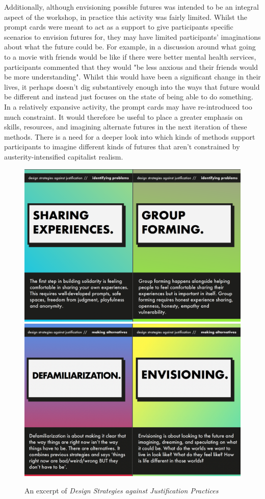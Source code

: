 Additionally, although envisioning possible futures was intended to be an integral aspect of the workshop, in practice this activity was fairly limited. Whilst the prompt cards were meant to act as a support to give participants specific scenarios to envision futures for, they may have limited participants' imaginations about what the future could be. For example, in a discussion around what going to a movie with friends would be like if there were better mental health services, participants commented that they would "be less anxious and their friends would be more understanding". Whilst this would have been a significant change in their lives, it perhaps doesn't dig substantively enough into the ways that future would be different and instead just focuses on the state of being able to do something. In a relatively expansive activity, the prompt cards may have re-introduced too much constraint. It would therefore be useful to place a greater emphasis on skills, resources, and imagining alternate futures in the next iteration of these methods. There is a need for a deeper look into which kinds of methods support participants to imagine different kinds of futures that aren't constrained by austerity-intensified capitalist realism. 
\begin{figure}
    \centering
    \includegraphics[width=1\linewidth
]{Images/7/design-strats-1.png}
    \includegraphics[width=1\linewidth]{Images/7/design-strats-2.png}
    \caption{An excerpt of \textit{Design Strategies against Justification Practices}}
    \label{fig:design-strats}
\end{figure}
